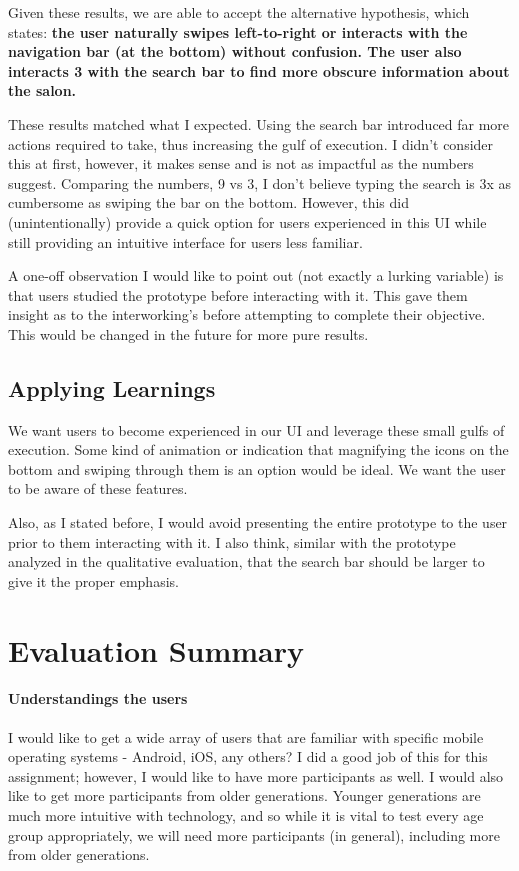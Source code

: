 Given these results, we are able to accept the alternative hypothesis, which states: \textbf{the user naturally swipes left-to-right or interacts with the navigation bar (at the bottom) without confusion. The user also interacts 3 with the search bar to find more obscure information about the salon.}

These results matched what I expected. Using the search bar introduced far more actions required to take, thus increasing the gulf of execution. I didn't consider this at first, however, it makes sense and is not as impactful as the numbers suggest. Comparing the numbers, 9 vs 3, I don't believe typing the search is 3x as cumbersome as swiping the bar on the bottom. However, this did (unintentionally) provide a quick option for users experienced in this UI while still providing an intuitive interface for users less familiar.

A one-off observation I would like to point out (not exactly a lurking variable) is that users studied the prototype before interacting with it. This gave them insight as to the interworking's before attempting to complete their objective. This would be changed in the future for more pure results.

\subsection{Applying Learnings}
We want users to become experienced in our UI and leverage these small gulfs of execution. Some kind of animation or indication that magnifying the icons on the bottom and swiping through them is an option would be ideal. We want the user to be aware of these features.

Also, as I stated before, I would avoid presenting the entire prototype to the user prior to them interacting with it. I also think, similar with the prototype analyzed in the qualitative evaluation, that the search bar should be larger to give it the proper emphasis.

\section{Evaluation Summary}

\paragraph{Understandings the users}
I would like to get a wide array of users that are familiar with specific mobile operating systems - Android, iOS, any others? I did a good job of this for this assignment; however, I would like to have more participants as well. I would also like to get more participants from older generations. Younger generations are much more intuitive with technology, and so while it is vital to test every age group appropriately, we will need more participants (in general), including more from older generations.

